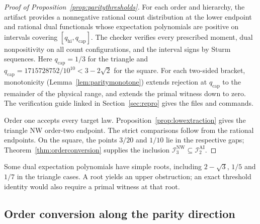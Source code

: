 \documentclass[11pt]{article}
\theoremstyle{plain}
\theoremstyle{definition}
\newcommand{\INW}{\mathcal I^{\mathrm{NW}}}
\newcommand{\IAI}{\mathcal I^{\mathrm{AI}}}
\begin{document}
\begin{proof}[Proof of Proposition~\ref{prop:paritythresholds}]
For each order and hierarchy, the artifact provides a nonnegative rational count distribution at the lower endpoint and rational dual functionals whose expectation polynomials are positive on intervals covering $[q_{\mathrm{hi}},q_{\mathrm{cap}}]$. The checker verifies every prescribed moment, dual nonpositivity on all count configurations, and the interval signs by Sturm sequences. Here $q_{\mathrm{cap}}=1/3$ for the triangle and $q_{\mathrm{cap}}=1715728752/10^{10}<3-2\sqrt2$ for the square. For each two-sided bracket, monotonicity (Lemma~\ref{lem:paritymonotone}) extends rejection at $q_{\mathrm{cap}}$ to the remainder of the physical range, and extends the primal witness down to zero. The verification guide linked in Section~\ref{sec:repro} gives the files and commands.

Order one accepts every target law. Proposition~\ref{prop:lowextraction} gives the triangle NW order-two endpoint. The strict comparisons follow from the rational endpoints. On the square, the points $3/20$ and $1/10$ lie in the respective gaps; Theorem~\ref{thm:orderconversion} supplies the inclusion $\INW_3\subseteq\IAI_2$.
\end{proof}

Some dual expectation polynomials have simple roots, including $2-\sqrt3$, $1/5$ and $1/7$ in the triangle cases. A root yields an upper obstruction; an exact threshold identity would also require a primal witness at that root.

\subsection{Order conversion along the parity direction}\label{app:parityconversion}
\end{document}
